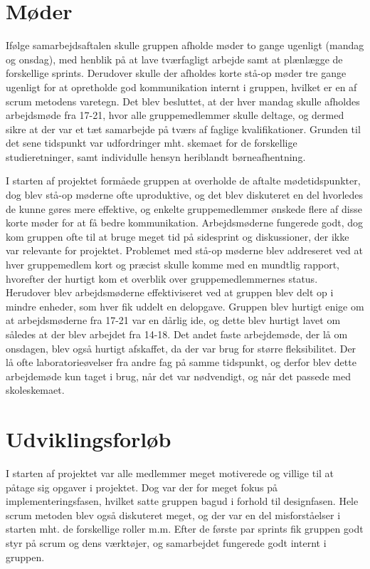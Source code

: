 \section{Møder}
Ifølge samarbejdsaftalen skulle gruppen afholde møder to gange ugenligt (mandag og onsdag), med henblik på at lave tværfagligt arbejde samt at plænlægge
de forskellige sprints. Derudover skulle der afholdes korte stå-op møder tre gange ugenligt for at opretholde god kommunikation internt i gruppen,
hvilket er en af scrum metodens varetegn.
Det blev besluttet, at der hver mandag skulle afholdes arbejdsmøde fra 17-21, hvor alle gruppemedlemmer skulle deltage, og dermed sikre at der var
et tæt samarbejde på tværs af faglige kvalifikationer. Grunden til det sene tidspunkt var udfordringer mht. skemaet for de forskellige studieretninger,
samt individulle hensyn heriblandt børneafhentning. 

I starten af projektet formåede gruppen at overholde de aftalte mødetidspunkter, dog blev stå-op møderne ofte uproduktive, og det blev diskuteret en del
hvorledes de kunne gøres mere effektive, og enkelte gruppemedlemmer ønskede flere af disse korte møder for at få bedre kommunikation. Arbejdsmøderne fungerede godt,
dog kom gruppen ofte til at bruge meget tid på sidesprint og diskussioner, der ikke var relevante for projektet.
Problemet med stå-op møderne blev addreseret ved at hver gruppemedlem kort og præcist skulle komme med en mundtlig rapport, hvorefter der hurtigt kom et overblik
over gruppemedlemmernes status. Herudover blev arbejdsmøderne effektiviseret ved at gruppen blev delt op i mindre enheder, som hver fik uddelt en delopgave. 
Gruppen blev hurtigt enige om at arbejdsmøderne fra 17-21 var en dårlig ide, og dette blev hurtigt lavet om således at der blev arbejdet fra 14-18.
Det andet faste arbejdemøde, der lå om onsdagen, blev også hurtigt afskaffet, da der var brug for større fleksibilitet. Der lå ofte laboratorieøvelser
fra andre fag på samme tidspunkt, og derfor blev dette arbejdemøde kun taget i brug, når det var nødvendigt, og når det passede med skoleskemaet.    

\section{Udviklingsforløb}
I starten af projektet var alle medlemmer meget motiverede og villige til at påtage sig opgaver i projektet. Dog var der for meget fokus på implementeringsfasen,
hvilket satte gruppen bagud i forhold til designfasen.
Hele scrum metoden blev også diskuteret meget, og der var en del misforståelser i starten mht. de forskellige roller m.m. Efter de første par sprints
fik gruppen godt styr på scrum og dens værktøjer, og samarbejdet fungerede godt internt i gruppen.

